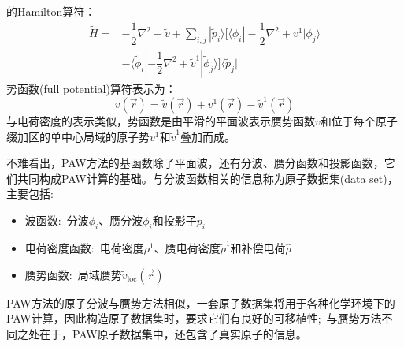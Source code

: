 {%
的\textrm{Hamilton}算符：
\begin{equation}
	\begin{aligned}
		\tilde H=&-\dfrac12\nabla^2+\tilde v+\sum_{i,j}|\tilde p_i\rangle\bigg[\langle\phi_i|-\dfrac12\nabla^2+v^1|\phi_j\rangle\\
			&-\langle\tilde\phi_i|-\dfrac12\nabla^2+\tilde v^1|\tilde\phi_j\rangle\bigg]\langle\tilde p_j| 
	\end{aligned}
	\label{eq:PAW-Blochl-15}
\end{equation}
势函数\textrm{(full potential)}算符表示为：
\begin{equation}
	v(\vec r)=\tilde v(\vec r)+v^1(\vec r)-\tilde v^1(\vec r)
	\label{eq:PAW-Blochl-16}
\end{equation}
与电荷密度的表示类似，势函数是由平滑的平面波表示赝势函数$\tilde v$和位于每个原子缀加区的单中心局域的原子势$v^1$和$\tilde v^1$叠加而成。%

不难看出，\textrm{PAW}方法的基函数除了平面波，还有分波、赝分函数和投影函数，它们共同构成\textrm{PAW}计算的基础。与分波函数相关的信息称为原子数据集(data set)，主要包括:
	\begin{itemize}
		\item 波函数:~分波$\phi_i$、赝分波$\tilde\phi_i$和投影子$\tilde p_i$
		\item 电荷密度函数:~电荷密度$\rho^1$、赝电荷密度$\tilde\rho^1$和补偿电荷$\hat\rho$
		\item 赝势函数:~局域赝势$\tilde v_{\mathrm{loc}}(\vec r)$
	\end{itemize}
\textrm{PAW}方法的原子分波与赝势方法相似，一套原子数据集将用于各种化学环境下的\textrm{PAW}计算，因此构造原子数据集时，要求它们有良好的可移植性;~与赝势方法不同之处在于，\textrm{PAW}原子数据集中，还包含了真实原子的信息。

}
